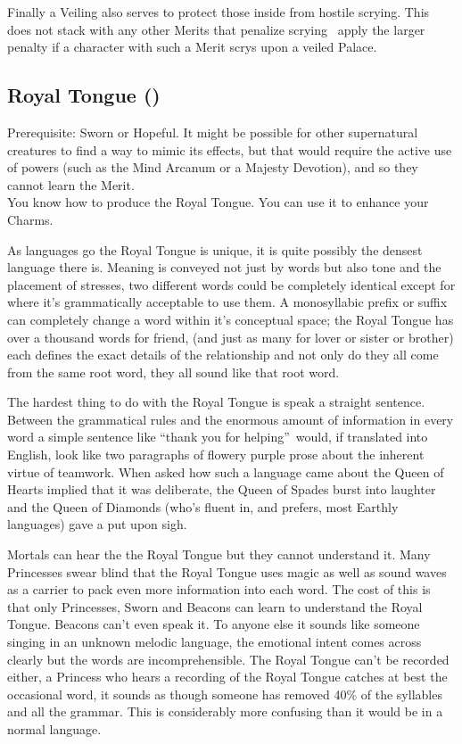 Finally a Veiling also serves to protect those inside from hostile scrying. This does not stack with any other Merits that penalize scrying \textendash\, apply the larger penalty if a character with such a Merit scrys upon a veiled Palace.


\subsection*{Royal Tongue (\textbullet)}

Prerequisite: Sworn or Hopeful. It might be possible for other supernatural creatures to find a way to mimic its effects, but that would require the active use of powers (such as the Mind Arcanum or a Majesty Devotion), and so they cannot learn the Merit.\\

\noindent You know how to produce the Royal Tongue. You can use it to enhance your Charms.

As languages go the Royal Tongue is unique, it is quite possibly the densest language there is. Meaning is conveyed not just by words but also tone and the placement of stresses, two different words could be completely identical except for where it's grammatically acceptable to use them. A monosyllabic prefix or suffix can completely change a word within it's conceptual space; the Royal Tongue has over a thousand words for friend, (and just as many for lover or sister or brother) each defines the exact details of the relationship and not only do they all come from the same root word, they all sound like that root word.

The hardest thing to do with the Royal Tongue is speak a straight sentence. Between the grammatical rules and the enormous amount of information in every word a simple sentence like \textquotedblleft thank you for helping\textquotedblright\, would, if translated into English, look like two paragraphs of flowery purple prose about the inherent virtue of teamwork. When asked how such a language came about the Queen of Hearts implied that it was deliberate, the Queen of Spades burst into laughter and the Queen of Diamonds (who's fluent in, and prefers, most Earthly languages) gave a put upon sigh.

Mortals can hear the the Royal Tongue but they cannot understand it. Many Princesses swear blind that the Royal Tongue uses magic as well as sound waves as a carrier to pack even more information into each word. The cost of this is that only Princesses, Sworn and Beacons can learn to understand the Royal Tongue. Beacons can't even speak it. To anyone else it sounds like someone singing in an unknown melodic language, the emotional intent comes across clearly but the words are incomprehensible. The Royal Tongue can't be recorded either, a Princess who hears a recording of the Royal Tongue catches at best the occasional word, it sounds as though someone has removed 40\% of the syllables and all the grammar. This is considerably more confusing than it would be in a normal language.

